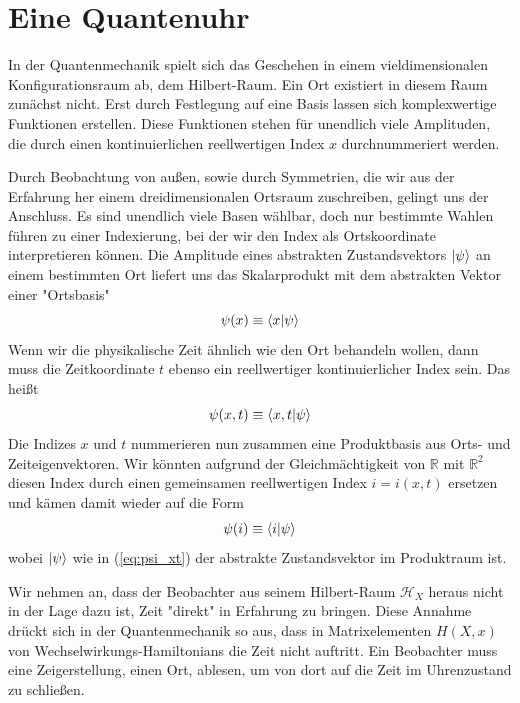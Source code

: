 \documentclass[12pt]{article}
\begin{document}
\section{Eine Quantenuhr}

In der Quantenmechanik spielt sich das Geschehen in einem vieldimensionalen Konfigurationsraum ab, dem Hilbert-Raum. Ein Ort existiert in diesem Raum zunächst nicht. Erst durch Festlegung auf eine Basis lassen sich komplexwertige Funktionen erstellen. Diese Funktionen stehen für unendlich viele Amplituden, die durch einen kontinuierlichen reellwertigen Index $x$ durchnummeriert werden.

Durch Beobachtung von außen, sowie durch Symmetrien, die wir aus der Erfahrung her einem dreidimensionalen Ortsraum zuschreiben, gelingt uns der Anschluss. Es sind unendlich viele Basen wählbar, doch nur bestimmte Wahlen führen zu einer Indexierung, bei der wir den Index als Ortskoordinate interpretieren können. Die Amplitude eines abstrakten Zustandsvektors $\ket{\psi}$ an einem bestimmten Ort liefert uns das Skalarprodukt mit dem abstrakten Vektor einer "Ortsbasis"
\begin{equation} 
\psi(x) \equiv \bra{x}\ket{\psi} 
\end{equation}
Wenn wir die physikalische Zeit ähnlich wie den Ort behandeln wollen, dann muss die Zeitkoordinate $t$ ebenso ein reellwertiger kontinuierlicher Index sein. Das heißt
\begin{equation} 
\label{eq:psi_xt}
\psi(x,t) \equiv \bra{x,t}\ket{\psi} 
\end{equation}
Die Indizes $x$ und $t$ nummerieren nun zusammen eine Produktbasis aus Orts- und Zeiteigenvektoren. Wir könnten aufgrund der Gleichmächtigkeit von $\mathbb{R}$ mit $\mathbb{R}^2$ diesen Index durch einen gemeinsamen reellwertigen Index $i = i(x,t)$ ersetzen und kämen damit wieder auf die Form
\begin{equation}
\psi(i) \equiv \bra{i}\ket{\psi} 
\end{equation}
wobei $\ket{\psi}$ wie in (\ref{eq:psi_xt}) der abstrakte Zustandsvektor im Produktraum ist.

Wir nehmen an, dass der Beobachter aus seinem Hilbert-Raum $\mathscr{H}_X$ heraus nicht in der Lage dazu ist, Zeit "direkt" in Erfahrung zu bringen. Diese Annahme drückt sich in der Quantenmechanik so aus, dass in Matrixelementen $H(X,x)$ von Wechselwirkungs-Hamiltonians die Zeit nicht auftritt. Ein Beobachter muss eine Zeigerstellung, einen Ort, ablesen, um von dort auf die Zeit im Uhrenzustand zu schließen. 
\end{document}
